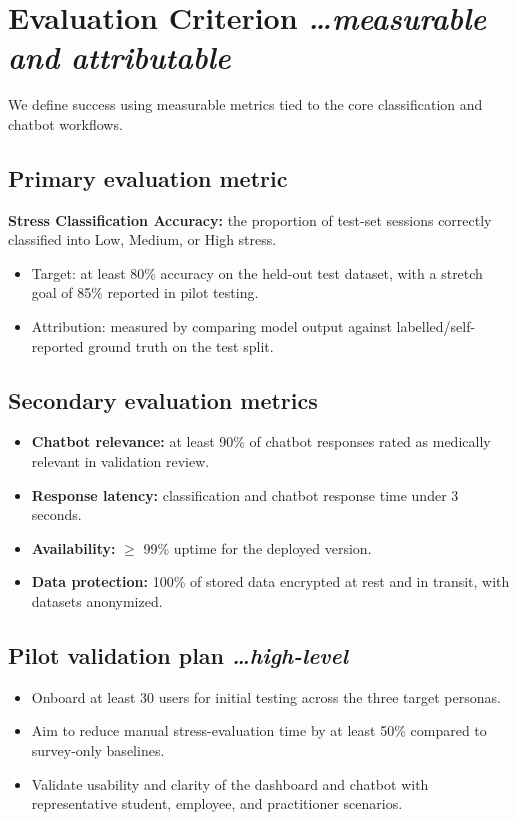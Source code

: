 \documentclass[11pt,a4paper]{article}
\newcommand{\BvrHint}[1]{%
  {\normalfont\normalsize\itshape\hfill #1}}
\begin{document}
\section{Evaluation Criterion %
\BvrHint{\ldots measurable and attributable}}
We define success using measurable metrics tied to the core classification and chatbot workflows.

\subsection{Primary evaluation metric}
\textbf{Stress Classification Accuracy:} the proportion of test-set sessions correctly classified into Low, Medium, or High stress.
\begin{itemize}[leftmargin=0.7cm]
    \item Target: at least 80\% accuracy on the held-out test dataset, with a stretch goal of 85\% reported in pilot testing.
    \item Attribution: measured by comparing model output against labelled/self-reported ground truth on the test split.
\end{itemize}

\subsection{Secondary evaluation metrics}
\begin{itemize}[leftmargin=0.7cm]
    \item \textbf{Chatbot relevance:} at least 90\% of chatbot responses rated as medically relevant in validation review.
    \item \textbf{Response latency:} classification and chatbot response time under 3 seconds.
    \item \textbf{Availability:} $\ge$ 99\% uptime for the deployed version.
    \item \textbf{Data protection:} 100\% of stored data encrypted at rest and in transit, with datasets anonymized.
\end{itemize}

\subsection{Pilot validation plan %
\BvrHint{\ldots high-level}}
\begin{itemize}[leftmargin=0.7cm]
    \item Onboard at least 30 users for initial testing across the three target personas.
    \item Aim to reduce manual stress-evaluation time by at least 50\% compared to survey-only baselines.
    \item Validate usability and clarity of the dashboard and chatbot with representative student, employee, and practitioner scenarios.
\end{itemize}
\end{document}
